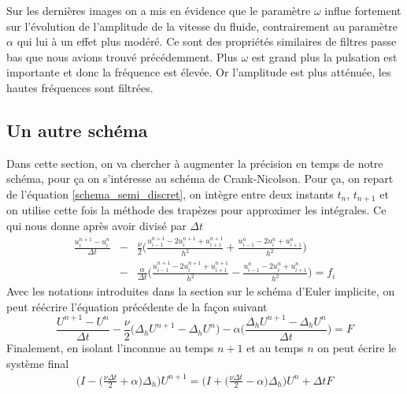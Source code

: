 Sur les dernières images on a mis en évidence que le paramètre $\omega$ influe fortement sur l'évolution de l'amplitude de la vitesse du fluide, contrairement au paramètre $\alpha$ qui lui à un effet plus modéré. Ce sont des propriétés similaires de filtres passe bas que nous avions trouvé précédemment. Plus $\omega$ est grand plus la pulsation est importante et donc la fréquence est élevée. Or l'amplitude est plus atténuée, les hautes fréquences sont filtrées.
\newpage
\subsection{Un autre schéma}
Dans cette section, on va chercher à augmenter la précision en temps de notre schéma, pour ça on s'intéresse au schéma de Crank-Nicolson. Pour ça, on repart de l'équation \eqref{schema_semi_discret}, on intègre entre deux instants $t_n$, $t_{n+1}$ et on utilise cette fois la méthode des trapèzes pour approximer les intégrales. Ce qui nous donne après avoir divisé par $\Delta t$
\begin{eqnarray}\label{schemaCN1}
    \frac{u_i^{n+1}-u_i^n}{\Delta t} &-& \frac{\nu}{2} \bigg( \frac{u_{i-1}^{n+1}-2u_i^{n+1}+ u_{i+1}^{n+1}}{h^2} + \frac{u_{i-1}^{n}-2u_i^{n}+u_{i+1}^{n}}{h^2} \bigg) \\
    &-& \frac{\alpha}{\Delta t}\bigg( \frac{u_{i-1}^{n+1}-2u_i^{n+1}+u_{i+1}^{n+1}}{h^2} 
    -\frac{u_{i-1}^{n}-2u_i^{n}+u_{i+1}^{n}}{h^2}\bigg) = f_i \nonumber
\end{eqnarray}
Avec les notations introduites dans la section sur le schéma d'Euler implicite, on peut réécrire l'équation précédente de la façon suivant
\begin{equation*}
    \frac{U^{n+1} - U^n}{\Delta t} - \frac{\nu}{2} \big(\Delta _h U^{n+1}-\Delta_hU^n\big) - \alpha\bigg(\frac{\Delta_h U^{n+1} - \Delta_h U^n}{\Delta t} \bigg) = F
\end{equation*}
Finalement, en isolant l'inconnue au temps $n+1$ et au temps $n$ on peut écrire le système final
\begin{eqnarray*}
    \Big(I - \Big( \frac{\nu \Delta t}{2} + \alpha \Big)\Delta_h\Big)  U^{n+1} = \Big(I + \Big(\frac{\nu \Delta t}{2} - \alpha\Big) \Delta_h\Big) U^n + \Delta t F
\end{eqnarray*}

